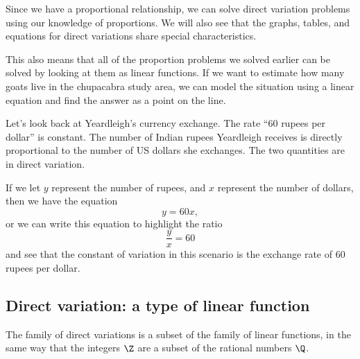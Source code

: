 Since we have a proportional relationship, we can solve direct variation problems using our knowledge of proportions. We will also see that the graphs, tables, and equations for direct variations share special characteristics.

This also means that all of the proportion problems we solved earlier can be solved by looking at them as linear functions. If we want to estimate how many goats live in the chupacabra study area, we can model the situation using a linear equation and find the answer as a point on the line.

Let's look back at Yeardleigh's currency exchange. The rate ``60 rupees per dollar'' is constant. The number of Indian rupees Yeardleigh receives is directly proportional to the number of US dollars she exchanges. The two quantities are in direct variation.

If we let $y$ represent the number of rupees, and $x$ represent the number of dollars, then we have the equation \[y = 60x,\] or we can write this equation to highlight the ratio \[\frac{y}{x} = 60\] and see that the constant of variation in this scenario is the exchange rate of 60 rupees per dollar.

%

\subsection{Direct variation: a type of linear function}

The family of direct variations is a subset of the family of linear functions, in the same way that the integers $\Z$ are a subset of the rational numbers $\Q$.

\begin{center}
\end{center}

